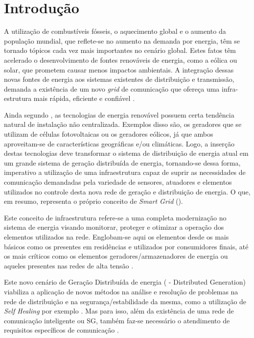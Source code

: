 \chapter{Introdução}
A utilização de combustíveis fósseis, o aquecimento global e o aumento da população mundial, que reflete-se no aumento na demanda por energia, têm se tornado tópicos cada vez mais importantes no cenário global. Estes fatos têm acelerado o desenvolvimento de fontes renováveis de energia, como a eólica ou solar, que prometem causar menos impactos ambientais. A integração dessas novas fontes de energia aos sistemas existentes de distribuição e transmissão, demanda a existência de um novo \emph{grid} de comunicação que ofereça uma infra-estrutura mais rápida, eficiente e confiável \cite{Art-Gungor2013}.

Ainda segundo \cite{Art-Gungor2013}, as tecnologias de energia renovável possuem certa tendência natural de instalação não centralizada. Exemplos disso são, os geradores que se utilizam de células fotovoltaicas ou os geradores eólicos, já que ambos aproveitam-se de características geográficas e/ou climáticas. Logo, a inserção destas tecnologias deve transformar o sistema de distribuição de energia atual em um grande sistema de geração distribuída de energia, tornando-se dessa forma, imperativo a utilização de uma infraestrutura capaz de suprir as necessidades de comunicação demandadas pela variedade de sensores, atuadores e elementos utilizados no controle desta nova rede de geração e distribuição de energia. O que, em resumo, representa o próprio conceito de \emph{Smart Grid} ().

Este conceito de infraestrutura refere-se a uma completa modernização no sistema de energia visando monitorar, proteger e otimizar a operação dos elementos utilizados na rede. Englobam-se aqui os elementos desde os mais básicos como os presentes em residências e utilizados por consumidores finais, até os mais críticos como os elementos geradores/armazenadores de energia ou aqueles presentes nas redes de alta tensão \cite{Conf-Sood2009}.

Este novo cenário de Geração Distribuída de energia ( - Distributed Generation) viabiliza a aplicação de novos métodos na análise e resolução de problemas na rede de distribuição e na segurança/estabilidade da mesma, como a utilização de \emph{Self Healing} por exemplo \cite{Art-Amin2006}. Mas para isso, além da existência de uma rede de comunicação inteligente ou SG, também faz-se necessário o atendimento de requisitos específicos de comunicação \cite{Conf-Sood2009}.

